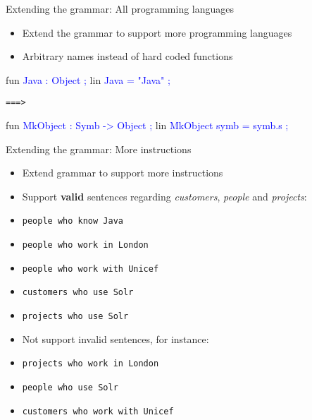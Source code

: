 \begin{frame}[fragile]{Extending the grammar: All programming languages}
\begin{itemize}
\item Extend the grammar to support more programming languages\pause
\item Arbitrary names instead of hard coded functions
\end{itemize}
\begin{semiverbatim}
fun
  \textcolor{Blue}{Java : Object ; }
lin
  \textcolor{Blue}{Java = \textcolor{String}{"Java"} ; }
\end{semiverbatim}\pause

\texttt{===>}

\begin{semiverbatim}
fun
  \textcolor{Blue}{MkObject : Symb -> Object ; }
lin
  \textcolor{Blue}{MkObject symb = symb.s ; }
\end{semiverbatim}
\end{frame}
\begin{frame}[fragile]{Extending the grammar: More instructions}
\begin{itemize}
\item Extend grammar to support more instructions\pause
\item Support \textbf{valid} sentences regarding \emph{customers}, \emph{people} and \emph{projects}:\pause
\end{itemize}
  \vspace{-4mm}\begin{itemize}
    \item[] \texttt{people who know Java}
    \item[] \texttt{people who work in London}
    \item[] \texttt{people who work with Unicef}
    \item[] \texttt{customers who use Solr}
    \item[] \texttt{projects who use Solr}
  \end{itemize}\pause
  \begin{itemize}
    \item Not support invalid sentences, for instance:
  \end{itemize}
   \vspace{-4mm}\begin{itemize}
    \item[] \texttt{projects who work in London}
    \item[] \texttt{people who use Solr}
    \item[] \texttt{customers who work with Unicef}
  \end{itemize}
\end{frame}

